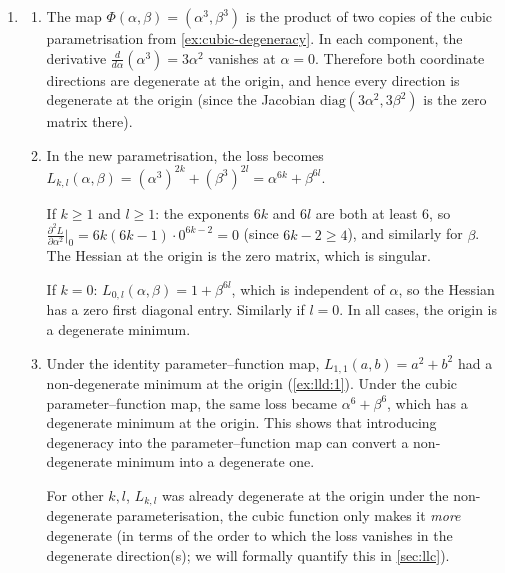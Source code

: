 \documentclass[11pt]{article}
\begin{document}
\begin{solution}
\begin{enumerate}
        This provides another example of loss landscape degeneracy without
        parameter--function map degeneracy: the identity parameter--function
        map is non-degenerate, but the circle of global minima creates a flat
        tangential direction.

    \item
    \begin{enumerate}
        \item
            The map $\Phi(\alpha, \beta) = (\alpha^3, \beta^3)$ is
            the product of two copies of the cubic parametrisation from
            \cref{ex:cubic-degeneracy}. In each component, the derivative
            $\frac{d}{d\alpha}(\alpha^3) = 3\alpha^2$ vanishes at
            $\alpha = 0$. Therefore both coordinate directions are degenerate
            at the origin, and hence every direction is degenerate at the
            origin (since the Jacobian $\mathrm{diag}(3\alpha^2, 3\beta^2)$
            is the zero matrix there).

        \item
            In the new parametrisation, the loss becomes
            $L_{k,l}(\alpha,\beta) = (\alpha^3)^{2k} + (\beta^3)^{2l}
            = \alpha^{6k} + \beta^{6l}$.

            If $k \geq 1$ and $l \geq 1$: the exponents $6k$ and $6l$ are
            both at least $6$, so
            $\frac{\partial^2 L}{\partial \alpha^2}\big|_0
            = 6k(6k{-}1) \cdot 0^{6k-2} = 0$
            (since $6k - 2 \geq 4$),
            and similarly for $\beta$. The Hessian at the origin is the zero
            matrix, which is singular.

            If $k = 0$: $L_{0,l}(\alpha,\beta) = 1 + \beta^{6l}$, which is
            independent of $\alpha$, so the Hessian has a zero first diagonal
            entry. Similarly if $l = 0$. In all cases, the origin is a
            degenerate minimum.

        \item
            Under the identity parameter--function map, $L_{1,1}(a,b) = a^2 +
            b^2$ had a non-degenerate minimum at the origin (\cref{ex:lld:1}).
            Under the cubic parameter--function map, the same loss became
            $\alpha^6 + \beta^6$, which has a degenerate minimum at the origin.
            This shows that introducing degeneracy into the parameter--function
            map can convert a non-degenerate minimum into a degenerate one.
            
            For other $k,l$, $L_{k,l}$ was already degenerate at the origin
            under the non-degenerate parameterisation, the cubic function only
            makes it \emph{more} degenerate (in terms of the order to which the
            loss vanishes in the degenerate direction(s); we will formally
            quantify this in \cref{sec:llc}).
    \end{enumerate}


\end{enumerate}
\end{solution}
\end{document}
